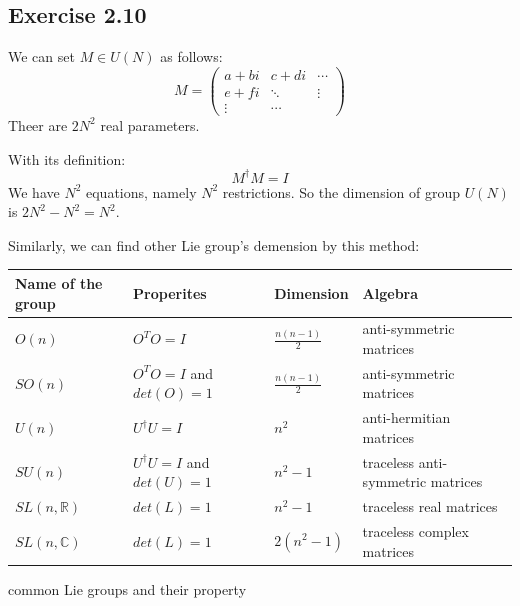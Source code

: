 \documentclass[]{ctexart}
\begin{document}
    \subsection{Exercise 2.10}
    We can set $M\in U(N)$ as follows:
    \begin{equation*}
      M=
      \begin{pmatrix}
      a+bi & c+di&\cdots\\
      e+fi & \ddots&\vdots\\
      \vdots&\cdots
      \end{pmatrix}
    \end{equation*}
    Theer are $2N^2$ real parameters. 
    
    With its definition:
    \begin{equation*}
      M^{\dagger}M=I
    \end{equation*}
    We have $N^2$ equations, namely $N^2$ restrictions. So the dimension of group $U(N)$ is $2N^2-N^2=N^2$.
    
    Similarly, we can find other Lie group's demension by this method:
    \begin{center}
    	\begin{tabular}{|l|l|l|l|}
    		\hline
    		\textbf{Name of the group}  & \textbf{Properites}             & \textbf{Dimension} & \textbf{Algebra}                  \\ \hline
    		\textbf{$O(n)$}             & $O^TO=I$                        & $\frac{n(n-1)}{2}$ & anti-symmetric matrices           \\ \hline
    		\textbf{$SO(n)$}            & $O^TO=I$ and $det(O)=1$         & $\frac{n(n-1)}{2}$ & anti-symmetric matrices           \\ \hline
    		\textbf{$U(n)$}             & $U^{\dagger}U=I$                & $n^2$              & anti-hermitian matrices           \\ \hline
    		\textbf{$SU(n)$}            & $U^{\dagger}U=I$ and $det(U)=1$ & $n^2-1$            & traceless anti-symmetric matrices \\ \hline
    		\textbf{$SL(n,\mathbb{R})$} & $det(L)=1$                      & $n^2-1$            & traceless real matrices           \\ \hline
    		\textbf{$SL(n,\mathbb{C})$} & $det(L)=1$                      & $2(n^2-1)$         & traceless complex matrices        \\ \hline
    	\end{tabular}
    \centerline{common Lie groups and their property}
    \end{center}
    
\end{document}
